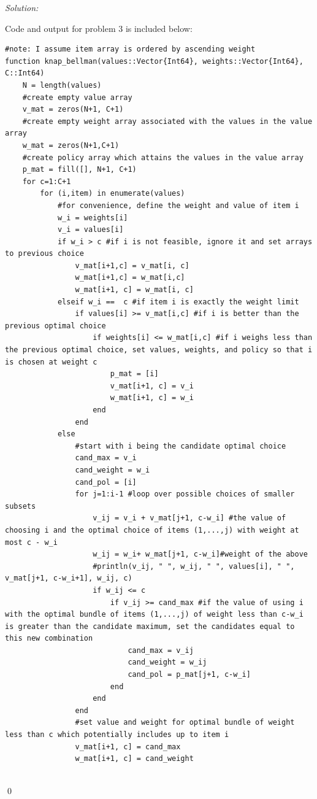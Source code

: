 \documentclass[12pt]{article}
\newenvironment{problem}[2][Problem]{\begin{trivlist}
       \item[\hskip \labelsep {\bfseries #1}\hskip \labelsep {\bfseries #2.}]}{\end{trivlist}}
\newenvironment{sol}
           {\emph{Solution:}
           }
           {
           \qed
           }
\begin{document}
       \begin{problem}{3}
        
       \end{problem}
       \begin{sol}
        Code and output for problem 3 is included below:
        \begin{lstlisting}
#note: I assume item array is ordered by ascending weight
function knap_bellman(values::Vector{Int64}, weights::Vector{Int64}, C::Int64)
    N = length(values)
    #create empty value array
    v_mat = zeros(N+1, C+1)
    #create empty weight array associated with the values in the value array
    w_mat = zeros(N+1,C+1)
    #create policy array which attains the values in the value array
    p_mat = fill([], N+1, C+1)
    for c=1:C+1
        for (i,item) in enumerate(values)
            #for convenience, define the weight and value of item i
            w_i = weights[i]
            v_i = values[i]
            if w_i > c #if i is not feasible, ignore it and set arrays to previous choice 
                v_mat[i+1,c] = v_mat[i, c]
                w_mat[i+1,c] = w_mat[i,c]
                w_mat[i+1, c] = w_mat[i, c]
            elseif w_i ==  c #if item i is exactly the weight limit
                if values[i] >= v_mat[i,c] #if i is better than the previous optimal choice
                    if weights[i] <= w_mat[i,c] #if i weighs less than the previous optimal choice, set values, weights, and policy so that i is chosen at weight c
                        p_mat = [i]
                        v_mat[i+1, c] = v_i
                        w_mat[i+1, c] = w_i
                    end
                end
            else
                #start with i being the candidate optimal choice
                cand_max = v_i
                cand_weight = w_i
                cand_pol = [i]
                for j=1:i-1 #loop over possible choices of smaller subsets
                    v_ij = v_i + v_mat[j+1, c-w_i] #the value of choosing i and the optimal choice of items (1,...,j) with weight at most c - w_i
                    w_ij = w_i+ w_mat[j+1, c-w_i]#weight of the above
                    #println(v_ij, " ", w_ij, " ", values[i], " ", v_mat[j+1, c-w_i+1], w_ij, c)
                    if w_ij <= c
                        if v_ij >= cand_max #if the value of using i with the optimal bundle of items (1,...,j) of weight less than c-w_i is greater than the candidate maximum, set the candidates equal to this new combination
                            cand_max = v_ij
                            cand_weight = w_ij
                            cand_pol = p_mat[j+1, c-w_i]
                        end
                    end
                end
                #set value and weight for optimal bundle of weight less than c which potentially includes up to item i
                v_mat[i+1, c] = cand_max
                w_mat[i+1, c] = cand_weight
                

\end{lstlisting}
\end{sol}
\end{document}

